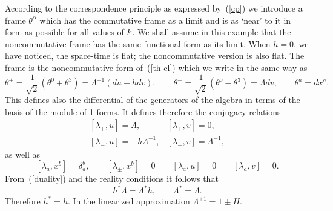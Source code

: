 \documentclass[12pt,a4paper]{article}
\newcounter{eg}
\def\kbar{{\mathchar'26\mkern-9muk}}
\begin{document}
According to the correspondence principle as expressed by~(\ref{cp})
we introduce a frame $\theta^\alpha$ which has the commutative frame as
a limit and is as `near' to it in form as possible for all values of
$\kbar$. We shall assume in this example that the noncommutative frame
has the same functional form as its limit.  When $h=0$, we have noticed,
the space-time is flat; the noncommutative version is also flat. 
The frame is the noncommutative form of~(\ref{th-cl}) which we write in
the same way as
\begin{equation}
\theta^+ = \frac 1{\sqrt 2}(\theta^0 + \theta^3) = 
\Lambda^{-1}(du + h dv ), \qquad 
\theta^- = \frac 1{\sqrt 2} (\theta^0 - \theta^3) = 
\Lambda dv, \qquad
\theta^a = dx^a.                                      \label{th-qu}
\end{equation}
This defines also the differential of the generators of the algebra
in terms of the basis of the module of 1-forms.  It defines therefore
the conjugacy relations
\begin{equation}
\begin{array}{ll}
[\lambda_+, u] = \Lambda, 
&[\lambda_+, v] = 0,                              \\[4pt]
[\lambda_-, u] = - h \Lambda^{-1}, 
&[\lambda_-, v] = \Lambda^{-1},
\end{array}                                        \label{duality}
\end{equation}
as well as 
$$
[\lambda_a, x^b] = \delta_a^b, \qquad [\lambda_\pm, x^b] = 0 
\qquad [\lambda_a, u] = 0  \qquad [\lambda_a, v] = 0.
$$
From~(\ref{duality}) and the reality conditions it follows that
$$
h^* \Lambda = \Lambda^* h, \qquad \Lambda^* = \Lambda.
$$
Therefore $h^* = h$. In the linearized approximation 
$\Lambda^{\pm 1} = 1 \pm H$.
\end{document}
